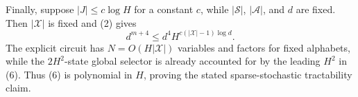 Finally, suppose \(|J|\le c\log H\) for a constant \(c\), while \(|\mathcal S|\), \(|\mathcal A|\), and \(d\) are fixed.  Then \(|\mathcal X|\) is fixed and (2) gives
\[
 d^{m+4}\le d^4H^{c(|\mathcal X|-1)\log d}.
\]
The explicit circuit has \(N=O(H|\mathcal X|)\) variables and factors for fixed alphabets, while the \(2H^2\)-state global selector is already accounted for by the leading \(H^2\) in (6).  Thus (6) is polynomial in \(H\), proving the stated sparse-stochastic tractability claim.